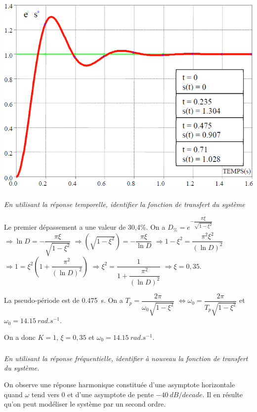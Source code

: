\documentclass[10pt,fleqn]{article} %
\begin{document}
\begin{multicols}{2}
\begin{center}
\includegraphics[width=\linewidth]{images/fig_01}
\end{center}




\subparagraph{}\textit{En utilisant la réponse temporelle, identifier la fonction de transfert du système}
\ifprof
\begin{corrige}
Le premier dépassement a une valeur de 30,4\%. On a
$D_\%=e^{-\dfrac{\pi \xi}{\sqrt{1-\xi^2}}}$
$\Rightarrow \ln D = -\dfrac{\pi \xi}{\sqrt{1-\xi^2}}$
$\Rightarrow \left( \sqrt{1-\xi^2} \right)  = -\dfrac{\pi \xi}{\ln D}$
$\Rightarrow 1-\xi^2= \dfrac{\pi^2 \xi^2}{\left(\ln D\right)^2}$
$\Rightarrow 1= \xi^2\left( 1+\dfrac{\pi^2 }{\left(\ln D\right)^2}\right)$
$\Rightarrow \xi^2= \dfrac{1}{ 1+\dfrac{\pi^2 }{\left(\ln D\right)^2}}$
$\Rightarrow \xi=0,35$.

La pseudo-période est de \SI{0,475}{s}. On a  $T_p=\dfrac{2\pi}{\omega_0\sqrt{1-\xi^2}}$
$\Leftrightarrow \omega_0=\dfrac{2\pi}{T_p\sqrt{1-\xi^2}}$ et $\omega_0=\SI{14,15}{rad.s^{-1}}$.
 
 On a donc $K=1$, $\xi=0,35$ et $\omega_0=\SI{14,15}{rad.s^{-1}}$.
\end{corrige}
\else
\fi

\subparagraph{}\textit{En utilisant la réponse fréquentielle, identifier à nouveau la fonction de transfert du système.}
\ifprof
\begin{corrige}
On observe une réponse harmonique constituée d'une asymptote horizontale quand $\omega$ tend vers 0 et d'une asymptote de pente $-\SI{40}{dB/decade}$. Il en résulte qu'on peut modéliser le système par un second ordre. 


\end{corrige}
\end{multicols}
\end{document}
